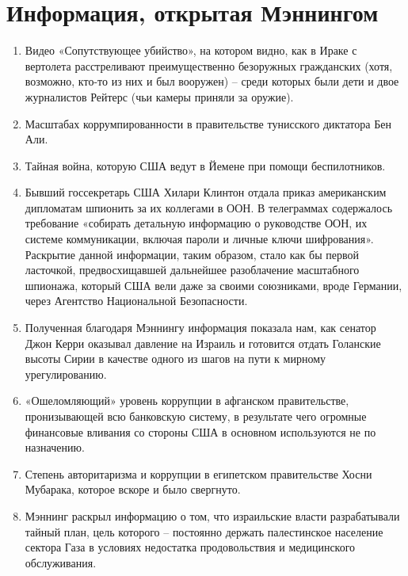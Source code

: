 ﻿\section{Информация, открытая Мэннингом}
\begin{enumerate}
\item Видео «Сопутствующее убийство», на котором видно, как в Ираке с вертолета расстреливают преимущественно безоружных гражданских (хотя, возможно, кто-то из них и был вооружен) – среди которых были дети и двое журналистов Рейтерс (чьи камеры приняли за оружие). 
\item Масштабах коррумпированности в правительстве тунисского диктатора Бен Али.
\item Тайная война, которую США ведут в Йемене при помощи беспилотников.
\item Бывший госсекретарь США Хилари Клинтон отдала приказ американским дипломатам шпионить за их коллегами в ООН. В телеграммах содержалось требование «собирать детальную информацию о руководстве ООН, их системе коммуникации, включая пароли и личные ключи шифрования». Раскрытие данной информации, таким образом, стало как бы первой ласточкой, предвосхищавшей дальнейшее разоблачение масштабного шпионажа, который США вели даже за своими союзниками, вроде Германии, через Агентство Национальной Безопасности.
\item Полученная благодаря Мэннингу информация показала нам, как сенатор Джон Керри оказывал давление на Израиль и готовится отдать Голанские высоты Сирии в качестве одного из шагов на пути к мирному урегулированию. 
\item «Ошеломляющий» уровень коррупции в афганском правительстве, пронизывающей всю банковскую систему, в результате чего огромные финансовые вливания со стороны США в основном используются не по назначению. 
\item Степень авторитаризма и коррупции в египетском правительстве Хосни Мубарака, которое вскоре и было свергнуто.
\item Мэннинг раскрыл информацию о том, что израильские власти разрабатывали тайный план, цель которого – постоянно держать палестинское население сектора Газа в условиях недостатка продовольствия и медицинского обслуживания. \cite{Argument}
\end{enumerate}